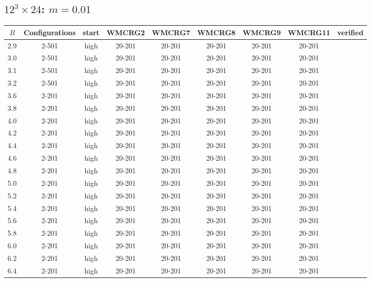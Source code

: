 \documentclass{article}
\begin{document}
\begin{center}
  \section*{$12^3\times24$:  $m=0.01$}
    \begin{center}
    \begin{tabular}{| c | c | c | c | c | c | c | c | c |}
      \hline
      $B$ & Configurations & start & WMCRG2 & WMCRG7 & WMCRG8 & WMCRG9 & WMCRG11 & verified\\
      \hline
      2.9 & 2-501 & high & 20-201 & 20-201 & 20-201 & 20-201 & 20-201 &\\
      3.0 & 2-501 & high & 20-201 & 20-201 & 20-201 & 20-201 & 20-201 &\\
      3.1 & 2-501 & high & 20-201 & 20-201 & 20-201 & 20-201 & 20-201 &\\
      3.2 & 2-501 & high & 20-201 & 20-201 & 20-201 & 20-201 & 20-201 &\\
      3.6 & 2-201 & high & 20-201 & 20-201 & 20-201 & 20-201 & 20-201 &\\
      3.8 & 2-201 & high & 20-201 & 20-201 & 20-201 & 20-201 & 20-201 &\\
      4.0 & 2-201 & high & 20-201 & 20-201 & 20-201 & 20-201 & 20-201 &\\
      4.2 & 2-201 & high & 20-201 & 20-201 & 20-201 & 20-201 & 20-201 &\\
      4.4 & 2-201 & high & 20-201 & 20-201 & 20-201 & 20-201 & 20-201 &\\
      4.6 & 2-201 & high & 20-201 & 20-201 & 20-201 & 20-201 & 20-201 &\\
      4.8 & 2-201 & high & 20-201 & 20-201 & 20-201 & 20-201 & 20-201 &\\
      5.0 & 2-201 & high & 20-201 & 20-201 & 20-201 & 20-201 & 20-201 &\\
      5.2 & 2-201 & high & 20-201 & 20-201 & 20-201 & 20-201 & 20-201 &\\
      5.4 & 2-201 & high & 20-201 & 20-201 & 20-201 & 20-201 & 20-201 &\\
      5.6 & 2-201 & high & 20-201 & 20-201 & 20-201 & 20-201 & 20-201 &\\
      5.8 & 2-201 & high & 20-201 & 20-201 & 20-201 & 20-201 & 20-201 &\\
      6.0 & 2-201 & high & 20-201 & 20-201 & 20-201 & 20-201 & 20-201 &\\
      6.2 & 2-201 & high & 20-201 & 20-201 & 20-201 & 20-201 & 20-201 &\\
      6.4 & 2-201 & high & 20-201 & 20-201 & 20-201 & 20-201 & 20-201 &\\

\end{tabular}
\end{center}
\end{center}
\end{document}
